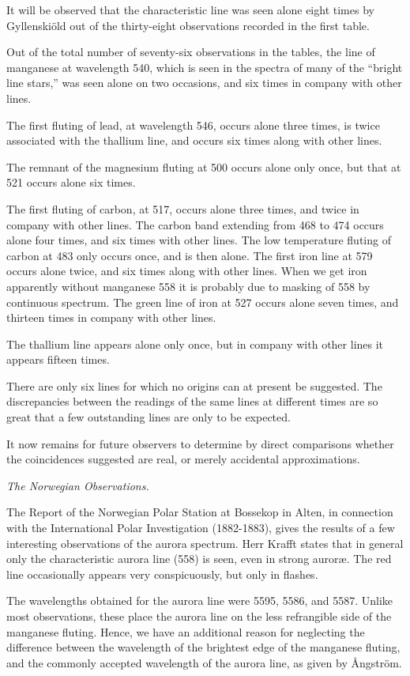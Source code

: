 \documentclass[a4paper, 12pt, oneside, polutonikogreek, english]{article}
\begin{document}
It will be observed that the characteristic line was seen alone eight times by Gyllenskiöld out of the thirty-eight observations recorded in the first table.

Out of the total number of seventy-six observations in the tables, the line of manganese at wavelength 540, which is seen in the spectra of many of the ``bright line stars,'' was seen alone on two occasions, and six times in company with other lines.

The first fluting of lead, at wavelength 546, occurs alone three times, is twice associated with the thallium line, and occurs six times along with other lines.

The remnant of the magnesium fluting at 500 occurs alone only once, but that at 521 occurs alone six times.

The first fluting of carbon, at 517, occurs alone three times, and twice in company with other lines. The carbon band extending from 468 to 474 occurs alone four times, and six times with other lines. The low temperature fluting of carbon at 483 only occurs once, and is then alone. The first iron line at 579 occurs alone twice, and six times along with other lines. When we get iron apparently without manganese 558 it is probably due to masking of 558 by continuous spectrum. The green line of iron at 527 occurs alone seven times, and thirteen times in company with other lines.

The thallium line appears alone only once, but in company with other lines it appears fifteen times.

There are only six lines for which no origins can at present be suggested. The discrepancies between the readings of the same lines at different times are so great that a few outstanding lines are only to be expected.

It now remains for future observers to determine by direct comparisons whether the coincidences suggested are real, or merely accidental approximations.

\emph{The Norwegian Observations.}

The Report of the Norwegian Polar Station at Bossekop in Alten, in connection with the International Polar Investigation (1882-1883), gives the results of a few interesting observations of the aurora spectrum. Herr Krafft states that in general only the characteristic aurora line (558) is seen, even in strong auroræ. The red line occasionally appears very conspicuously, but only in flashes.

The wavelengths obtained for the aurora line were 5595, 5586, and 5587. Unlike most observations, these place the aurora line on the less refrangible side of the manganese fluting. Hence, we have an additional reason for neglecting the difference between the wavelength of the brightest edge of the manganese fluting, and the commonly accepted wavelength of the aurora line, as given by Ångström.
\end{document}
